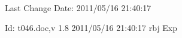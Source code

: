 Last Change $ $Date: 2011/05/16 21:40:17 $ $

$ $Id: t046.doc,v 1.8 2011/05/16 21:40:17 rbj Exp $ $
